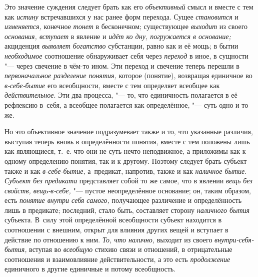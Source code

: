 \label{bkm:bm31a}Это значение суждения следует брать как его {\em объективный}
смысл и вместе с тем как {\em истину} встречавшихся у нас ранее форм перехода.
Сущее {\em становится} и {\em изменяется,} конечное {\em тонет} в бесконечном;
существующее {\em выходит} из своего {\em основания, вступает} в явление
и {\em идёт ко дну, погружается в основание;} акциденция {\em выявляет
богатство} субстанции, равно как и её мощь; в бытии {\em необходимое}
соотношение обнаруживает себя через {\em переход} в иное, в сущности "--- через
свечение в чём-то ином. Эти переход и свечение теперь перешли
в {\em первоначальное разделение понятия,} которое (понятие), возвращая
единичное во {\em в-себе-бытие} его всеобщности, вместе с тем определяет
всеобщее как {\em действительное}. Эти два процесса, "--- то, что единичность
полагается в её рефлексию в~себя, а всеобщее полагается как
определённое, "--- суть одно и то же.

Но это объективное значение подразумевает также и то, что
указанные различия, выступая теперь вновь в определённости понятия, вместе
с тем положены лишь как являющиеся, т.~е. что они не суть нечто
неподвижное, а приложимы как к одному определению понятия, так и к другому.
Поэтому следует брать субъект также и как {\em в-себе-бытие,}
а~предикат, напротив, также и как {\em наличное бытие}.
{\em Субъект без предиката} представляет собой то же самое, что в явлении
{\em вещь без свойств, вещь-в-себе,} "--- пустое неопределённое
основание; он, таким образом, есть {\em понятие внутри себя самого,}
получающее различение и определённость лишь в предикате;
последний, стало быть, составляет сторону {\em наличного бытия}
субъекта. В~силу этой определённой всеобщности субъект
находится в соотношении с внешним, открыт для влияния других вещей и
вступает в действие по отношению к ним. {\em То, что налично,} выходит
из своего {\em внутри-себя-бытия,} вступая во {\em всеобщую}
стихию связи и отношений, в отрицательные соотношения и
взаимовлияние действительности, а это есть {\em продолжение}
единичного в другие единичные и потому всеобщность.

